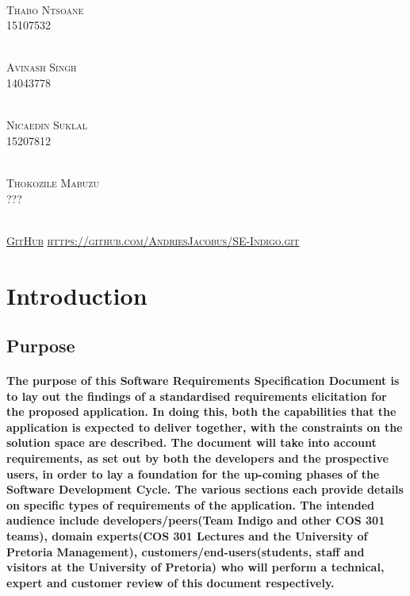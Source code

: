 \documentclass[runningheads,a4paper]{llncs}
\begin{document}
\begin{titlepage}
\begin{center}
\begin{multicols}{2}
				
				\textsc{\large\\
					Thabo Ntsoane\\
					15107532\\
				}
				
				\columnbreak
				
				\textsc{\large\\
					 Avinash Singh\\
					14043778\\
				}
				
				\textsc{\large\\
					Nicaedin Suklal\\
					15207812\\
				}

				
				\textsc{\large\\
					Thokozile Mabuzu\\
					???\\
				}
				
			\end{multicols}
			
			
			\textsc{	\\ \href{https://github.com/AndriesJacobus/SE-Indigo}{GitHub}
				\url{https://github.com/AndriesJacobus/SE-Indigo.git}}
			
		\end{center}
	\end{titlepage}

\begingroup

\tableofcontents
{}
\endgroup
\newpage


\section{Introduction}

\subsection{Purpose}
\paragraph*{The purpose of this Software Requirements Specification Document is to lay out the findings of a standardised requirements elicitation for the proposed application. In doing this, both the capabilities that the application is expected to deliver together, with the constraints on the solution space are described. The document will take into account requirements, as set out by both the developers and the prospective users, in order to lay a foundation for the up-coming phases of the Software Development Cycle. The various sections each provide details on specific types of requirements of the application. The intended audience include developers/peers(Team Indigo and other COS 301 teams), domain experts(COS 301 Lectures and the University of Pretoria Management), customers/end-users(students, staff and visitors at the University of Pretoria) who will perform a technical, expert  and customer review of this document respectively. }
\end{document}
